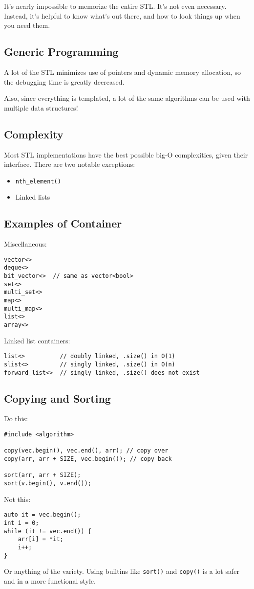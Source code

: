 It's nearly impossible to memorize the entire STL. It's not even necessary. Instead, it's helpful to know what's out there, and how to look things up when you need them.

\subsection{Generic Programming}
A lot of the STL minimizes use of pointers and dynamic memory allocation, so the debugging time is greatly decreased.

Also, since everything is templated, a lot of the same algorithms can be used with multiple data structures!

\subsection{Complexity}
Most STL implementations have the best possible big-O complexities, given their interface. There are two notable exceptions:
\begin{itemize}
	\item \lstinline[style=C++]{nth_element()}
	\item Linked lists
\end{itemize}

\subsection{Examples of Container}
Miscellaneous:
\begin{lstlisting}[style=C++]
vector<>
deque<>
bit_vector<>  // same as vector<bool>
set<>
multi_set<>
map<>
multi_map<>
list<>
array<>
\end{lstlisting}
Linked list containers:
\begin{lstlisting}[style=C++]
list<>          // doubly linked, .size() in O(1)
slist<>         // singly linked, .size() in O(n)
forward_list<>  // singly linked, .size() does not exist
\end{lstlisting}

\subsection{Copying and Sorting}
Do this:
\begin{lstlisting}[style=C++]
#include <algorithm>

copy(vec.begin(), vec.end(), arr); // copy over
copy(arr, arr + SIZE, vec.begin()); // copy back

sort(arr, arr + SIZE);
sort(v.begin(), v.end());	
\end{lstlisting}
Not this:
\begin{lstlisting}[style=C++]
auto it = vec.begin();
int i = 0;
while (it != vec.end()) {
    arr[i] = *it;
    i++;
}
\end{lstlisting}
Or anything of the variety. Using builtins like \lstinline[style=C++]{sort()} and \lstinline[style=C++]{copy()} is a lot safer and in a more functional style.

